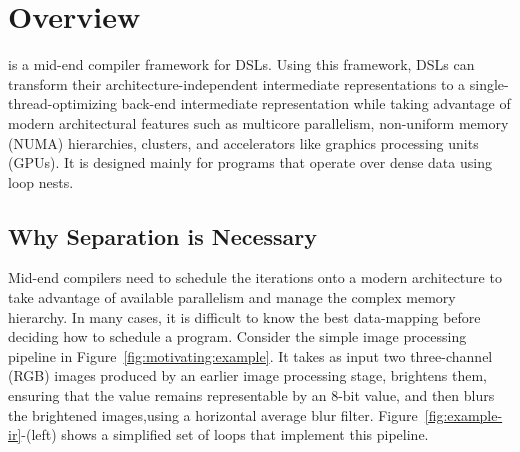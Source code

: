 \section{\framework Overview}


\framework is a mid-end compiler framework for DSLs. Using this framework, DSLs can transform their architecture-independent intermediate representations to a single-thread-optimizing back-end intermediate representation while taking advantage of modern architectural features  such as multicore parallelism, non-uniform memory (NUMA) hierarchies, clusters, and accelerators like graphics processing units (GPUs).
It is designed mainly for programs that operate over dense data using loop nests.
\subsection{Why Separation is Necessary}

Mid-end compilers need to schedule the iterations onto a modern architecture to take advantage of available parallelism and manage the complex memory hierarchy.
In many cases, it is difficult to know the best data-mapping before deciding how to schedule a program.  Consider the simple image processing pipeline in Figure~\ref{fig:motivating:example}.  It takes as input two three-channel (RGB) images produced by an earlier image processing stage, brightens them, ensuring that the value remains representable by an 8-bit value, and then blurs the brightened images,using a horizontal average blur filter.  Figure~\ref{fig:example-ir}-\codeone (left) shows a simplified set of loops that implement this pipeline.

